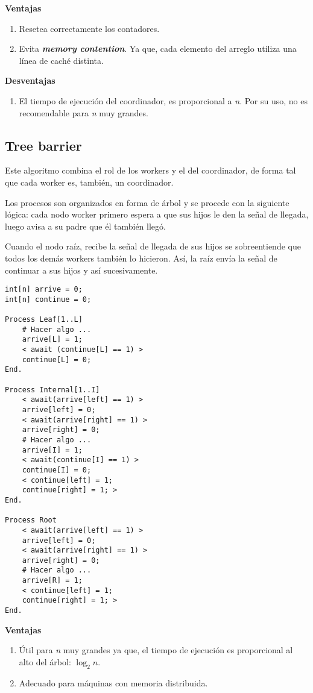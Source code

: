 \documentclass[a4paper, 10pt, margin=0in]{report}
\begin{document}
\textbf{Ventajas}
\begin{enumerate}
    \item Resetea correctamente los contadores.
    \item Evita \textbf{\emph{memory contention}}. Ya que, cada elemento del arreglo utiliza una línea de caché distinta.
\end{enumerate}

\textbf{Desventajas}
\begin{enumerate}
    \item El tiempo de ejecución del coordinador, es proporcional a \emph{n}. Por su uso, no es recomendable para \emph{n} muy grandes.
\end{enumerate}

\subsection{Tree barrier}
Este algoritmo combina el rol de los workers y el del coordinador, de forma tal que cada worker es, también, un coordinador.

Los procesos son organizados en forma de árbol y se procede con la siguiente lógica: cada nodo worker primero espera a que sus hijos le den la señal de llegada, luego avisa a su padre que él también llegó.

Cuando el nodo raíz, recibe la señal de llegada de sus hijos se sobreentiende que todos los demás workers también lo hicieron. Así, la raíz envía la señal de continuar a sus hijos y así sucesivamente.

\begin{lstlisting}[multicols=2]
int[n] arrive = 0;
int[n] continue = 0;
    
Process Leaf[1..L]
    # Hacer algo ...
    arrive[L] = 1;
    < await (continue[L] == 1) >
    continue[L] = 0;
End.
    
Process Internal[1..I]
    < await(arrive[left] == 1) >
    arrive[left] = 0;
    < await(arrive[right] == 1) >
    arrive[right] = 0;
    # Hacer algo ...
    arrive[I] = 1;
    < await(continue[I] == 1) >
    continue[I] = 0;
    < continue[left] = 1; 
    continue[right] = 1; >
End.
    
Process Root
    < await(arrive[left] == 1) >
    arrive[left] = 0;
    < await(arrive[right] == 1) >
    arrive[right] = 0;
    # Hacer algo ...
    arrive[R] = 1;
    < continue[left] = 1;
    continue[right] = 1; >
End.
\end{lstlisting}

\textbf{Ventajas}
\begin{enumerate}
    \item Útil para \emph{n} muy grandes ya que, el tiempo de ejecución es proporcional al alto del árbol: $\log_2n$.
    \item Adecuado para máquinas con memoria distribuida.
\end{enumerate}
\end{document}
